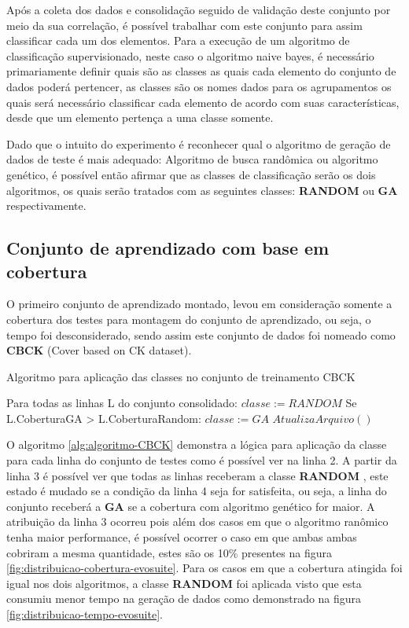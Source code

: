 \documentclass[
	12pt,				%
	oneside,			%
	a4paper,			%
	english,			%
	brazil				%
	]{abntex2ppgsi}
\begin{document}
Após a coleta dos dados e consolidação seguido de validação deste conjunto por meio da sua correlação, é possível trabalhar com este conjunto para assim classificar cada um dos elementos. Para a execução de um algoritmo de classificação supervisionado, neste caso o algoritmo naive bayes, é necessário primariamente definir quais são as classes as quais cada elemento do conjunto de dados poderá pertencer, as classes são os nomes dados para os agrupamentos os quais será necessário classificar cada elemento de acordo com suas características, desde que um elemento pertença a uma classe somente.

Dado que o intuito do experimento é reconhecer qual o algoritmo de geração de dados de teste é mais adequado: Algoritmo de busca randômica ou algoritmo genético, é possível então afirmar que as classes de classificação serão os dois algoritmos, os quais serão tratados com as seguintes classes:  \textbf{RANDOM} ou \textbf{GA} respectivamente. 

\subsection{Conjunto de aprendizado com base em cobertura}

O primeiro conjunto de aprendizado montado, levou em consideração somente a cobertura dos testes para montagem do conjunto de aprendizado, ou seja, o tempo foi desconsiderado, sendo assim este conjunto de dados foi nomeado como \textbf{CBCK} (Cover based on CK dataset).

\begin{algorithm}[htbp]
\caption{Algoritmo para aplicação das classes no conjunto de treinamento CBCK}
\label{alg:algoritmo-CBCK}
\begin{algorithmic}[1]

\State Para todas as linhas L do conjunto consolidado:
\State $classe := RANDOM$
\State 		Se L.CoberturaGA > L.CoberturaRandom: $classe := GA$
\State $AtualizaArquivo()$
\EndProcedure
\end{algorithmic}
\end{algorithm}

O algoritmo \ref{alg:algoritmo-CBCK} demonstra a lógica para aplicação da classe para cada linha do conjunto de testes como é possível ver na linha 2. A partir da linha 3 é possível ver que todas as linhas receberam a classe \textbf{RANDOM} , este estado é mudado se a condição da linha 4 seja for satisfeita, ou seja, a linha do conjunto receberá a  \textbf{GA} se a cobertura com algoritmo genético for maior. A atribuição da linha 3 ocorreu pois além dos casos em que o algoritmo ranômico tenha maior performance, é possível ocorrer o caso em que ambas ambas cobriram a mesma quantidade, estes são os 10\% presentes na figura \ref{fig:distribuicao-cobertura-evosuite}. Para os casos em que a cobertura atingida foi igual nos dois algoritmos, a classe  \textbf{RANDOM}  foi aplicada visto que esta consumiu menor tempo na geração de dados como demonstrado na figura \ref{fig:distribuicao-tempo-evosuite}.
\end{document}
